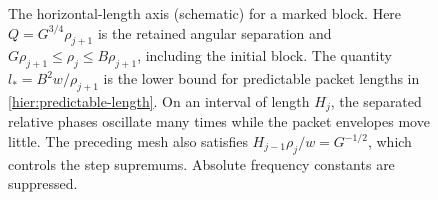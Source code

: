 \begin{figure}[tbp]
\centering
{}
\caption{The horizontal-length axis (schematic) for a marked block.
Here \(Q=G^{3/4}\rho_{j+1}\) is the retained angular separation and
\(G\rho_{j+1}\le\rho_j\le B\rho_{j+1}\), including the initial block.
The quantity \(l_*=B^2w/\rho_{j+1}\) is the lower bound for predictable
packet lengths in \eqref{hier:predictable-length}.
On an interval of length \(H_j\), the separated relative phases
oscillate many times while the packet envelopes move little.
The preceding mesh also satisfies
\(H_{j-1}\rho_j/w=G^{-1/2}\), which controls the step supremums.
Absolute frequency constants are suppressed.}
\label{fig:phase-scales}
\end{figure}
